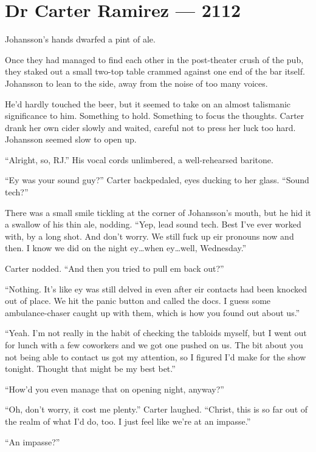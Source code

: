 \hypertarget{dr-carter-ramirez-2112}{%
\chapter*{Dr Carter Ramirez — 2112}\label{dr-carter-ramirez-2112}}

Johansson's hands dwarfed a pint of ale.

Once they had managed to find each other in the post-theater crush of the pub, they staked out a small two-top table crammed against one end of the bar itself. Johansson to lean to the side, away from the noise of too many voices.

He'd hardly touched the beer, but it seemed to take on an almost talismanic significance to him. Something to hold. Something to focus the thoughts. Carter drank her own cider slowly and waited, careful not to press her luck too hard. Johansson seemed slow to open up.

``Alright, so, RJ.'' His vocal cords unlimbered, a well-rehearsed baritone.

``Ey was your sound guy?'' Carter backpedaled, eyes ducking to her glass. ``Sound tech?''

There was a small smile tickling at the corner of Johansson's mouth, but he hid it a swallow of his thin ale, nodding. ``Yep, lead sound tech. Best I've ever worked with, by a long shot. And don't worry. We still fuck up eir pronouns now and then. I know we did on the night ey\ldots{}when ey\ldots{}well, Wednesday.''

Carter nodded. ``And then you tried to pull em back out?''

``Nothing. It's like ey was still delved in even after eir contacts had been knocked out of place. We hit the panic button and called the docs. I guess some ambulance-chaser caught up with them, which is how you found out about us.''

``Yeah. I'm not really in the habit of checking the tabloids myself, but I went out for lunch with a few coworkers and we got one pushed on us. The bit about you not being able to contact us got my attention, so I figured I'd make for the show tonight. Thought that might be my best bet.''

``How'd you even manage that on opening night, anyway?''

``Oh, don't worry, it cost me plenty.'' Carter laughed. ``Christ, this is so far out of the realm of what I'd do, too. I just feel like we're at an impasse.''

``An impasse?''

